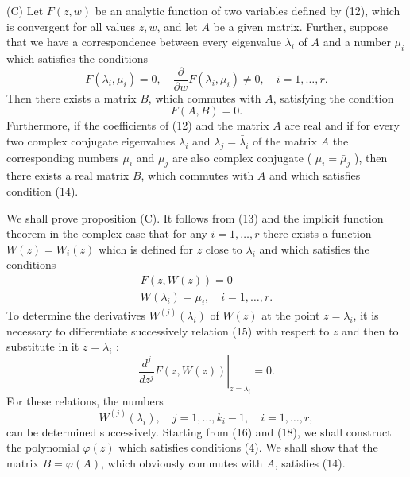 \documentclass[10pt,a5paper]{book}
\makeatletter
\theoremstyle{plain}
\theoremstyle{definition}
\theoremstyle{remark}
\renewenvironment{proof}[1][\proofname]{\par
  \pushQED{\qed}%
  \normalfont\topsep6\p@\@plus6\p@\relax
  \trivlist
  \item\relax{\itshape #1\@addpunct{.}}\hspace\labelsep\ignorespaces
}{\popQED\endtrivlist\@endpefalse}
\makeatother
\begin{document}
\begin{proof}
(C) Let $F(z, w)$ be an analytic function of two variables defined by (12), which is convergent for all values $z, w$, and let $A$ be a given matrix. Further, suppose that we have a correspondence between every eigenvalue $\lambda_{i}$ of $A$ and a number $\mu_{i}$ which satisfies the conditions
\begin{equation*}
F\left(\lambda_{i}, \mu_{i}\right)=0, \quad \frac{\partial}{\partial w} F\left(\lambda_{i}, \mu_{i}\right) \neq 0, \quad i=1, \ldots, r . \tag{13}
\end{equation*}
Then there exists a matrix $B$, which commutes with $A$, satisfying the condition
\begin{equation*}
F(A, B)=0 . \tag{14}
\end{equation*}
Furthermore, if the coefficients of (12) and the matrix $A$ are real and if for every two complex conjugate eigenvalues $\lambda_{i}$ and $\lambda_{j}=\bar{\lambda}_{i}$ of the matrix $A$ the corresponding numbers $\mu_{i}$ and $\mu_{j}$ are also complex conjugate ( $\mu_{i}=\bar{\mu}_{j}$ ), then there exists a real matrix $B$, which commutes with $A$ and which satisfies condition (14).

We shall prove proposition (C). It follows from (13) and the implicit function theorem in the complex case that for any $i=1, \ldots, r$ there exists a function $W(z)=W_{i}(z)$ which is defined for $z$ close to $\lambda_{i}$ and which satisfies the conditions
\begin{gather*}
F(z, W(z))=0  \tag{15}\\
W\left(\lambda_{i}\right)=\mu_{i}, \quad i=1, \ldots, r . \tag{16}
\end{gather*}
To determine the derivatives $W^{(j)}\left(\lambda_{i}\right)$ of $W(z)$ at the point $z=\lambda_{i}$, it is necessary to differentiate successively relation (15) with respect to $z$ and then to substitute in it $z=\lambda_{i}$ :
\begin{equation*}
\left.\frac{d^{j}}{d z^{j}} F(z, W(z))\right|_{z=\lambda_{i}}=0 . \tag{17}
\end{equation*}
For these relations, the numbers
\begin{equation*}
W^{(j)}\left(\lambda_{i}\right), \quad j=1, \ldots, k_{i}-1, \quad i=1, \ldots, r, \tag{18}
\end{equation*}
can be determined successively. Starting from (16) and (18), we shall construct the polynomial $\varphi(z)$ which satisfies conditions (4). We shall show that the matrix $B=\varphi(A)$, which obviously commutes with $A$, satisfies (14).


\end{proof}
\end{document}
